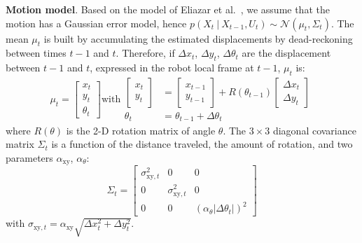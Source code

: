 \documentclass{svmult}
\begin{document}

\textbf{Motion model}. Based on the model of Eliazar et al.~\cite{eliazar2004motionmodel}, we assume that the motion has a Gaussian error model, hence $p(X_t~|~X_{t-1}, U_{t})\sim\mathcal{N}(\mu_t,\Sigma_t)$.
The mean $\mu_t$ is built by accumulating the estimated displacements by dead-reckoning between times $t-1$ and $t$.
Therefore, if $\Delta x_t$, $\Delta y_t$, $\Delta \theta_t$ are the displacement between $t-1$ and $t$, expressed in the robot local frame at $t-1$, $\mu_t$ is:
\begin{equation}
\mu_t =
\left[ \begin{array}{c} x_t \\ y_t \\ \theta_t \end{array} \right]
\text{with}
\begin{array}{cl}
\left[ \begin{array}{c} x_t \\ y_t \end{array} \right] &=
\left[ \begin{array}{c} x_{t-1} \\ y_{t-1} \end{array} \right] +
R(\theta_{t-1})
\left[ \begin{array}{c} \Delta x_{t} \\ \Delta y_{t} \end{array} \right]
\\
\theta_t &= \theta_{t-1} + \Delta \theta_t
\end{array}
\end{equation}
where $R(\theta)$ is the 2-D rotation matrix of angle $\theta$.
The $3\times3$ diagonal covariance matrix $\Sigma_t$ is a function of the distance traveled, the amount of rotation, and two parameters $\alpha_\mathrm{xy}$, $\alpha_\theta$:
\begin{equation}
\Sigma_t=\begin{bmatrix} \sigma_{\mathrm{xy},t}^2 & 0 & 0 \\ 0 & \sigma_{\mathrm{xy},t}^2 & 0 \\ 0 & 0 & (\alpha_\theta | \Delta \theta_t |)^2 \end{bmatrix}
\end{equation}
with $ \sigma_{\mathrm{xy},t} = \alpha_\mathrm{xy} \sqrt{\Delta x_{t}^2 + \Delta y_{t}^2}$.
\end{document}
